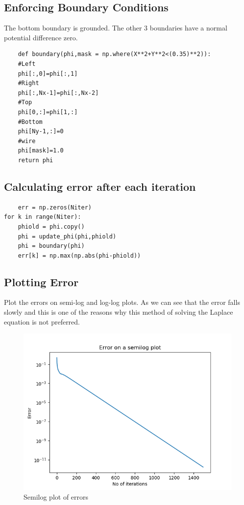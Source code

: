 \documentclass[11pt, a4paper]{article}
\begin{document}
 	\subsection{Enforcing Boundary Conditions}
	The bottom boundary is grounded. The other 3 boundaries have a normal potential difference zero.
	\begin{verbatim}
	def boundary(phi,mask = np.where(X**2+Y**2<(0.35)**2)):
    #Left
    phi[:,0]=phi[:,1]
    #Right
    phi[:,Nx-1]=phi[:,Nx-2] 
    #Top 
    phi[0,:]=phi[1,:] 
    #Bottom
    phi[Ny-1,:]=0
    #wire
    phi[mask]=1.0
    return phi
	\end{verbatim}
	\subsection{Calculating error after each iteration}
	\begin{verbatim}
	err = np.zeros(Niter)
for k in range(Niter):
    phiold = phi.copy()
    phi = update_phi(phi,phiold)
    phi = boundary(phi)
    err[k] = np.max(np.abs(phi-phiold))
	\end{verbatim}
	\subsection{Plotting Error}
	Plot the errors on semi-log and log-log plots. As we can see that the error
falls slowly and this is one of the reasons why this method of solving the
Laplace equation is not preferred.
\begin{figure}[!tbh]
   	\centering
   	\includegraphics[scale=0.5]{fig1.png}  %
   	\caption{Semilog plot of errors}
   	\label{fig:sample}
   \end{figure} 
   
\end{document}
